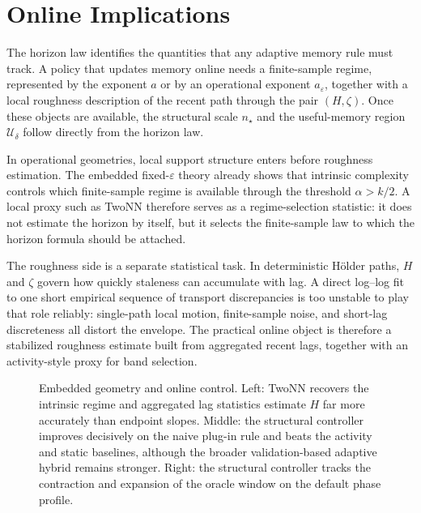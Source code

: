 \section{Online Implications}\label{sec:online_implications}

The horizon law identifies the quantities that any adaptive memory rule must
track. A policy that updates memory online needs a finite-sample regime,
represented by the exponent $a$ or by an operational exponent
$a_{\varepsilon}$, together with a local roughness description of the recent
path through the pair $(H,\zeta)$. Once these objects are available, the
structural scale $n_\star$ and the useful-memory region $\mathcal U_\delta$
follow directly from the horizon law.

In operational geometries, local support structure enters before roughness
estimation. The embedded fixed-$\varepsilon$ theory already shows that intrinsic
complexity controls which finite-sample regime is available through the
threshold $\alpha>k/2$. A local proxy such as TwoNN therefore serves as a
regime-selection statistic: it does not estimate the horizon by itself, but it
selects the finite-sample law to which the horizon formula should be attached.

The roughness side is a separate statistical task. In deterministic H\"older
paths, $H$ and $\zeta$ govern how quickly staleness can accumulate with lag. A
direct log--log fit to one short empirical sequence of transport discrepancies is
too unstable to play that role reliably: single-path local motion, finite-sample
noise, and short-lag discreteness all distort the envelope. The practical online
object is therefore a stabilized roughness estimate built from aggregated recent
lags, together with an activity-style proxy for band selection.

\begin{figure}[!htbp]
\centering
{}
\caption{Embedded geometry and online control. Left: TwoNN recovers the
intrinsic regime and aggregated lag statistics estimate $H$ far more accurately
than endpoint slopes. Middle: the structural controller improves decisively on
the naive plug-in rule and beats the activity and static baselines, although the
broader validation-based adaptive hybrid remains stronger. Right: the structural
controller tracks the contraction and expansion of the oracle window on the
default phase profile.}
\label{fig:online_implications}
\end{figure}

